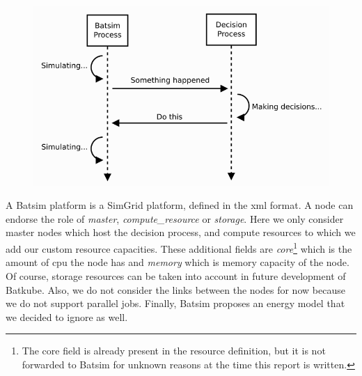 \begin{figure}[H]
	\centering
	\includegraphics[scale=0.5]{imgs/batsim-sequence-diag.png}
	\label{fig:bati-seq-diag}
\end{figure}

A Batsim platform is a SimGrid platform, defined in the xml format. A node can
endorse the role of \textit{master}, \textit{compute\_resource} or
\textit{storage}. Here we only consider master nodes which host the decision
process, and compute resources to which we add our custom resource capacities.
These additional fields are \textit{core}\footnote{The core field is already
present in the resource definition, but it is not forwarded to Batsim for
unknown reasons at the time this report is written.} which is the amount of cpu
the node has and \textit{memory} which is memory capacity of the node. Of
course, storage resources can be taken into account in future development of
Batkube. Also, we do not consider the links between the nodes for now because
we do not support parallel jobs. Finally, Batsim proposes an energy model that
we decided to ignore as well.\\

